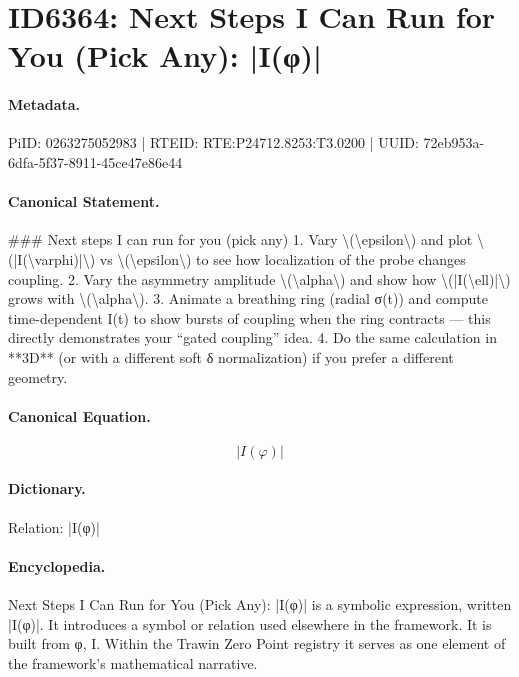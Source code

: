 \section*{ID6364: Next Steps I Can Run for You (Pick Any): |I(φ)|}
\paragraph{Metadata.}
PiID: 0263275052983 | RTEID: RTE:P24712.8253:T3.0200 | UUID: 72eb953a-6dfa-5f37-8911-45ce47e86e44

\paragraph{Canonical Statement.}
\#\#\# Next steps I can run for you (pick any) 1. Vary \textbackslash{}(\textbackslash{}epsilon\textbackslash{}) and plot \textbackslash{}(|I(\textbackslash{}varphi)|\textbackslash{}) vs \textbackslash{}(\textbackslash{}epsilon\textbackslash{}) to see how localization of the probe changes coupling. 2. Vary the asymmetry amplitude \textbackslash{}(\textbackslash{}alpha\textbackslash{}) and show how \textbackslash{}(|I(\textbackslash{}ell)|\textbackslash{}) grows with \textbackslash{}(\textbackslash{}alpha\textbackslash{}). 3. Animate a breathing ring (radial σ(t)) and compute time-dependent I(t) to show bursts of coupling when the ring contracts — this directly demonstrates your “gated coupling” idea. 4. Do the same calculation in **3D** (or with a different soft δ normalization) if you prefer a different geometry.

\paragraph{Canonical Equation.}
\[
|I(\varphi)|
\]

\paragraph{Dictionary.}
Relation: |I(φ)|

\paragraph{Encyclopedia.}
Next Steps I Can Run for You (Pick Any): |I(φ)| is a symbolic expression, written |I(φ)|. It introduces a symbol or relation used elsewhere in the framework. It is built from φ, I. Within the Trawin Zero Point registry it serves as one element of the framework's mathematical narrative.
